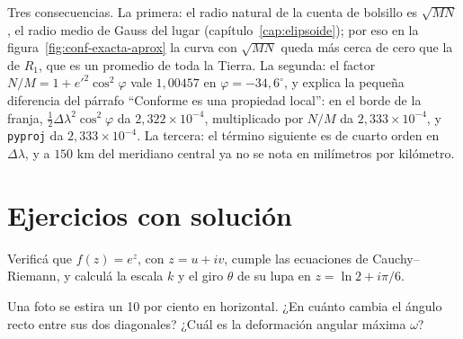 Tres consecuencias. La primera: el radio natural de la cuenta de bolsillo es \(\sqrt{MN}\), el
radio medio de Gauss del lugar (capítulo~\ref{cap:elipsoide}); por eso en la
figura~\ref{fig:conf-exacta-aprox} la curva con \(\sqrt{MN}\) queda más cerca de cero que la de
\(R_1\), que es un promedio de toda la Tierra. La segunda: el factor
\(N/M=1+e'^2\cos^2\varphi\) vale \(1{,}00457\) en \(\varphi=-34{,}6^\circ\), y explica la pequeña
diferencia del párrafo \enquote{Conforme es una propiedad local}: en el borde de la franja,
\(\tfrac12\Delta\lambda^2\cos^2\varphi\) da \(2{,}322\times10^{-4}\), multiplicado por \(N/M\) da
\(2{,}333\times10^{-4}\), y \texttt{pyproj} da \(2{,}333\times10^{-4}\). La tercera: el término
siguiente es de cuarto orden en \(\Delta\lambda\), y a \(150\) km del meridiano central ya no
se nota en milímetros por kilómetro.

\section{Ejercicios con solución}

\begin{ejercicio}\label{ex:conf-exp}
Verificá que \(f(z)=e^z\), con \(z=u+iv\), cumple las ecuaciones de Cauchy--Riemann, y calculá la
escala \(k\) y el giro \(\theta\) de su lupa en \(z=\ln2+i\pi/6\).
\end{ejercicio}

\begin{ejercicio}\label{ex:conf-foto10}
Una foto se estira un 10 por ciento en horizontal. ¿En cuánto cambia el ángulo recto entre
sus dos diagonales? ¿Cuál es la deformación angular máxima \(\omega\)?
\end{ejercicio}

